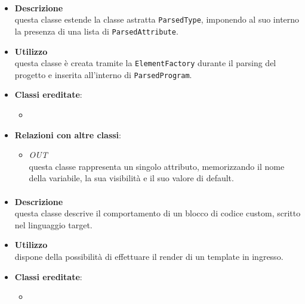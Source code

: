 \paragraph{}
\label{\nogloxy{SWEDesigner::Server::Project::ParsedClass}}
\begin{itemize}
\item \textbf{Descrizione}\\
questa classe estende la classe astratta \texttt{ParsedType}, imponendo al suo interno la presenza di una lista di \texttt{ParsedAttribute}. 
\item \textbf{Utilizzo}\\
questa classe è creata tramite la \texttt{ElementFactory} durante il parsing del progetto e inserita all'interno di \texttt{ParsedProgram}.
\item \textbf{Classi ereditate}:
\begin{itemize}
\item \hyperref[\nogloxy{SWEDesigner::Server::Project::ParsedType}]{}
\end{itemize}
\item \textbf{Relazioni con altre classi}:
\begin{itemize}
\item \textit{OUT} \hyperref[\nogloxy{SWEDesigner::Server::Project::ParsedAttribute}]{}\\
questa classe rappresenta un singolo attributo, memorizzando il nome della variabile, la sua visibilità e il suo valore di default. 
\end{itemize}
\end{itemize}

\paragraph{}
\label{\nogloxy{SWEDesigner::Server::Project::ParsedCustom}}
\begin{itemize}
\item \textbf{Descrizione}\\
questa classe descrive il comportamento di un blocco di codice custom, scritto nel linguaggio target.	
\item \textbf{Utilizzo}\\
dispone della possibilità di effettuare il render di un template in ingresso.
\item \textbf{Classi ereditate}:
\begin{itemize}
\item \hyperref[\nogloxy{SWEDesigner::Server::Project::ParsedInstruction}]{}
\end{itemize}
\end{itemize}

